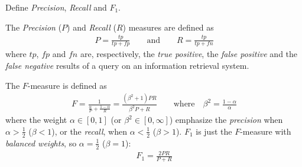 \exercise

Define \emph{Precision}, \emph{Recall} and $F_1$.

\solution

The \emph{Precision} ($P$) and \emph{Recall} ($R$) measures are defined as
%
\begin{align*}
  P = \frac{tp}{tp + fp}\quad\quad \text{and} \quad\quad R = \frac{tp}{tp + fn}
\end{align*}
%
where $tp$, $fp$ and $fn$ are, respectively, the \emph{true positive}, the
\emph{false positive} and the \emph{false negative} results of a query on an
information retrieval system.

The $F$-measure is defined as
%
\begin{align*}
  F = \frac{1}{\frac{\alpha}{P} + \frac{1 - \alpha}{R}} =
  \frac{(\beta^2 + 1)PR}{\beta^2P + R}\quad\quad \text{where} \quad
  \beta^2 = \frac{1 - \alpha}{\alpha}
\end{align*}
%
where the weight $\alpha \in \left[ 0, 1 \right]$ (or $\beta^2 \in \left[ 0,
\infty \right]$) emphasize the \emph{precision} when $\alpha > \frac{1}{2}$
($\beta < 1$), or the \emph{recall}, when $\alpha < \frac{1}{2}$ ($\beta > 1$).
$F_1$ is just the $F$-measure with \emph{balanced weights}, so $\alpha =
\frac{1}{2}$ ($\beta = 1$):
%
\begin{align*}
  F_1 = \frac{2PR}{P + R}
\end{align*}
